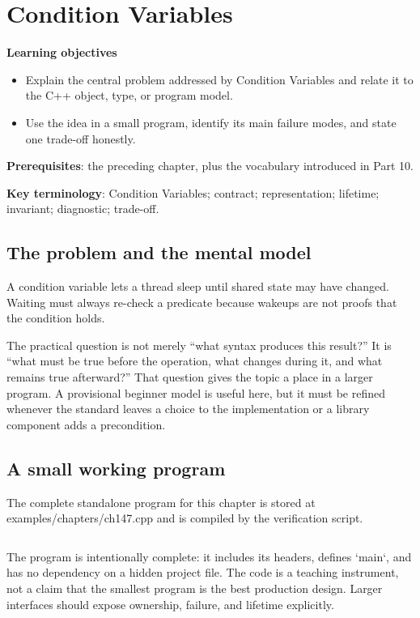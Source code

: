 \chapter{Condition Variables}
\begin{chaptermeta}
\textbf{Learning objectives}
\begin{itemize}
  \item Explain the central problem addressed by Condition Variables and relate it to the C++ object, type, or program model.
  \item Use the idea in a small program, identify its main failure modes, and state one trade-off honestly.
\end{itemize}
\textbf{Prerequisites}: the preceding chapter, plus the vocabulary introduced in Part 10.

\textbf{Key terminology}: Condition Variables; contract; representation; lifetime; invariant; diagnostic; trade-off.
\end{chaptermeta}

\section{The problem and the mental model}
A condition variable lets a thread sleep until shared state may have changed. Waiting must always re-check a predicate because wakeups are not proofs that the condition holds.

The practical question is not merely “what syntax produces this result?” It is “what must be true before the operation, what changes during it, and what remains true afterward?” That question gives the topic a place in a larger program. A provisional beginner model is useful here, but it must be refined whenever the standard leaves a choice to the implementation or a library component adds a precondition.

\section{A small working program}
The complete standalone program for this chapter is stored at examples/chapters/ch147.cpp and is compiled by the verification script.

\inputminted[fontsize=\scriptsize,breaklines]{cpp}{examples/chapters/ch147.cpp}

The program is intentionally complete: it includes its headers, defines `main`, and has no dependency on a hidden project file. The code is a teaching instrument, not a claim that the smallest program is the best production design. Larger interfaces should expose ownership, failure, and lifetime explicitly.

